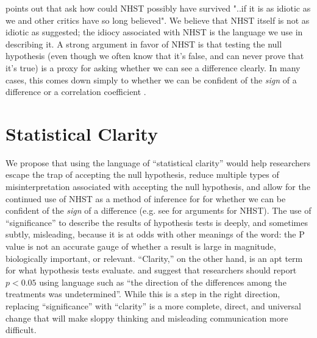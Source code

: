 \citet{Kramer2011} points out that \citep{ZiliakandMcCloskey2008} ask how could NHST possibly have survived "..if it is as idiotic as we and other critics have so long believed". We believe that NHST itself is not as idiotic as suggested; the idiocy associated with NHST is the language we use in describing it. A strong argument in favor of NHST is that testing the null hypothesis (even though we often know that it's false, and can never prove that it's true) is a proxy for asking whether we can see a difference clearly. In many cases, this comes down simply to whether we can be confident of the \emph{sign} of a difference or a correlation coefficient \cite{robinson2001past}. 

\section*{Statistical Clarity}

We propose that using the language of ``statistical clarity'' would help researchers escape the trap of accepting the null hypothesis, reduce multiple types of misinterpretation associated with accepting the null hypothesis, and allow for the continued use of NHST as a method of inference for for whether we can be confident of the \emph{sign} of a difference (e.g. see \citealt{Abelson1997} for arguments for NHST). The use of ``significance'' to describe the results of hypothesis tests is deeply, and sometimes subtly, misleading, because it is at odds with other meanings of the word: the P value is not an accurate gauge of whether a result is large in magnitude, biologically important, or relevant. ``Clarity,'' on the other hand, is an apt term for what hypothesis tests evaluate. \citet{Jones2000} and \citet{Robinson2001} suggest that researchers should report $p < 0.05$ using language such as ``the direction of the differences among the treatments was undetermined''. While this is a step in the right direction, replacing ``significance'' with ``clarity'' is a more complete, direct, and universal change that will make sloppy thinking and misleading communication more difficult.

